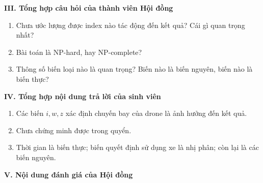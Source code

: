 \vspace{0.4cm}
\noindent\textbf{III. Tổng hợp câu hỏi của thành viên Hội đồng}

\begin{enumerate}
    \item Chưa ước lượng được index nào tác động đến kết quả? Cái gì quan trọng nhất?
    \item Bài toán là NP-hard, hay NP-complete?
    \item Thông số biến loại nào là quan trọng? Biến nào là biến nguyên, biến nào là biến thực?
\end{enumerate}

\vspace{0.4cm}
\noindent\textbf{IV. Tổng hợp nội dung trả lời của sinh viên}

\begin{enumerate}
    \item Các biến \( i, w, z \) xác định chuyến bay của drone là ảnh hưởng đến kết quả.
    \item Chưa chứng minh được trong quyển.
    \item Thời gian là biến thực; biến quyết định sử dụng xe là nhị phân; còn lại là các biến nguyên.
\end{enumerate}

\vspace{0.4cm}
\noindent\textbf{V. Nội dung đánh giá của Hội đồng}

